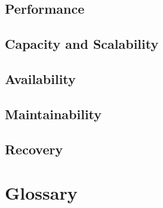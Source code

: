 \documentclass[12pt]{article}
\begin{document}
	\subsection{Performance}


	
	\subsection{Capacity and Scalability}



	
	\subsection{Availability}


	
	\subsection{Maintainability}



	\subsection{Recovery}



\section{Glossary}
\end{document}
